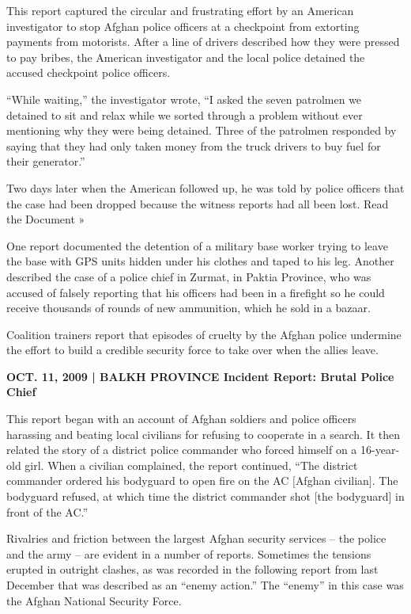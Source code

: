 ﻿\documentclass[12pt]{article}
\begin{document}
This report captured the circular and frustrating effort by an American investigator to stop Afghan
police officers at a checkpoint from extorting payments from motorists. After a line of drivers
described how they were pressed to pay bribes, the American investigator and the local police
detained the accused checkpoint police officers.

``While waiting,'' the investigator wrote, ``I asked the seven patrolmen we detained to sit and
relax while we sorted through a problem without ever mentioning why they were being detained. Three
of the patrolmen responded by saying that they had only taken money from the truck drivers to buy
fuel for their generator.''

Two days later when the American followed up, he was told by police officers that the case had been
dropped because the witness reports had all been lost. Read the Document »

One report documented the detention of a military base worker trying to leave the base with GPS
units hidden under his clothes and taped to his leg. Another described the case of a police chief in
Zurmat, in Paktia Province, who was accused of falsely reporting that his officers had been in a
firefight so he could receive thousands of rounds of new ammunition, which he sold in a bazaar.

Coalition trainers report that episodes of cruelty by the Afghan police undermine the effort to
build a credible security force to take over when the allies leave.

\textbf{OCT. 11, 2009 | BALKH PROVINCE Incident Report: Brutal Police Chief}

This report began with an account of Afghan soldiers and police officers harassing and beating local
civilians for refusing to cooperate in a search. It then related the story of a district police
commander who forced himself on a 16-year-old girl. When a civilian complained, the report
continued, ``The district commander ordered his bodyguard to open fire on the AC $[$Afghan
civilian$]$. The bodyguard refused, at which time the district commander shot $[$the bodyguard$]$ in
front of the AC.''

Rivalries and friction between the largest Afghan security services -- the police and the army --
are evident in a number of reports. Sometimes the tensions erupted in outright clashes, as was
recorded in the following report from last December that was described as an ``enemy action.'' The
``enemy'' in this case was the Afghan National Security Force.
\end{document}
